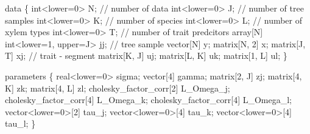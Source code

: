 \documentclass[
  12pt,
  letterpaper,
  DIV=11,
  numbers=noendperiod]{scrartcl}
\newenvironment{Shaded}{\begin{snugshade}}{\end{snugshade}}
\newcommand{\CommentTok}[1]{\textcolor[rgb]{0.37,0.37,0.37}{#1}}
\newcommand{\DataTypeTok}[1]{\textcolor[rgb]{0.68,0.00,0.00}{#1}}
\newcommand{\DecValTok}[1]{\textcolor[rgb]{0.68,0.00,0.00}{#1}}
\newcommand{\KeywordTok}[1]{\textcolor[rgb]{0.00,0.23,0.31}{#1}}
\newcommand{\NormalTok}[1]{\textcolor[rgb]{0.00,0.23,0.31}{#1}}
\begin{document}
\begin{Shaded}
\begin{Highlighting}[]
\KeywordTok{data}\NormalTok{ \{}
  \DataTypeTok{int}\NormalTok{\textless{}}\KeywordTok{lower}\NormalTok{=}\DecValTok{0}\NormalTok{\textgreater{} N; }\CommentTok{// number of data}
  \DataTypeTok{int}\NormalTok{\textless{}}\KeywordTok{lower}\NormalTok{=}\DecValTok{0}\NormalTok{\textgreater{} J; }\CommentTok{// number of tree samples}
  \DataTypeTok{int}\NormalTok{\textless{}}\KeywordTok{lower}\NormalTok{=}\DecValTok{0}\NormalTok{\textgreater{} K; }\CommentTok{// number of species}
  \DataTypeTok{int}\NormalTok{\textless{}}\KeywordTok{lower}\NormalTok{=}\DecValTok{0}\NormalTok{\textgreater{} L; }\CommentTok{// number of xylem types}
  \DataTypeTok{int}\NormalTok{\textless{}}\KeywordTok{lower}\NormalTok{=}\DecValTok{0}\NormalTok{\textgreater{} T; }\CommentTok{// number of trait predcitors}
  \DataTypeTok{array}\NormalTok{[N] }\DataTypeTok{int}\NormalTok{\textless{}}\KeywordTok{lower}\NormalTok{=}\DecValTok{1}\NormalTok{, }\KeywordTok{upper}\NormalTok{=J\textgreater{} jj; }\CommentTok{// tree sample}
  \DataTypeTok{vector}\NormalTok{[N] y;}
  \DataTypeTok{matrix}\NormalTok{[N, }\DecValTok{2}\NormalTok{] x;}
  \DataTypeTok{matrix}\NormalTok{[J, T] xj; }\CommentTok{// trait {-} segment}
  \DataTypeTok{matrix}\NormalTok{[K, J] uj;}
  \DataTypeTok{matrix}\NormalTok{[L, K] uk;}
  \DataTypeTok{matrix}\NormalTok{[}\DecValTok{1}\NormalTok{, L] ul;}
\NormalTok{\}}

\KeywordTok{parameters}\NormalTok{ \{}
  \DataTypeTok{real}\NormalTok{\textless{}}\KeywordTok{lower}\NormalTok{=}\DecValTok{0}\NormalTok{\textgreater{} sigma;}
  \DataTypeTok{vector}\NormalTok{[}\DecValTok{4}\NormalTok{] gamma;}
  \DataTypeTok{matrix}\NormalTok{[}\DecValTok{2}\NormalTok{, J] zj;}
  \DataTypeTok{matrix}\NormalTok{[}\DecValTok{4}\NormalTok{, K] zk;}
  \DataTypeTok{matrix}\NormalTok{[}\DecValTok{4}\NormalTok{, L] zl;}
  \DataTypeTok{cholesky\_factor\_corr}\NormalTok{[}\DecValTok{2}\NormalTok{] L\_Omega\_j;}
  \DataTypeTok{cholesky\_factor\_corr}\NormalTok{[}\DecValTok{4}\NormalTok{] L\_Omega\_k;}
  \DataTypeTok{cholesky\_factor\_corr}\NormalTok{[}\DecValTok{4}\NormalTok{] L\_Omega\_l;}
  \DataTypeTok{vector}\NormalTok{\textless{}}\KeywordTok{lower}\NormalTok{=}\DecValTok{0}\NormalTok{\textgreater{}[}\DecValTok{2}\NormalTok{] tau\_j;}
  \DataTypeTok{vector}\NormalTok{\textless{}}\KeywordTok{lower}\NormalTok{=}\DecValTok{0}\NormalTok{\textgreater{}[}\DecValTok{4}\NormalTok{] tau\_k;}
  \DataTypeTok{vector}\NormalTok{\textless{}}\KeywordTok{lower}\NormalTok{=}\DecValTok{0}\NormalTok{\textgreater{}[}\DecValTok{4}\NormalTok{] tau\_l;}
\NormalTok{\}}


\end{Highlighting}
\end{Shaded}
\end{document}
